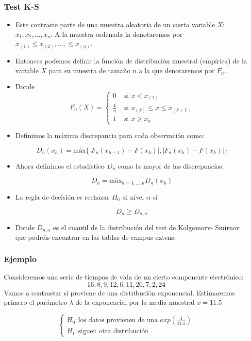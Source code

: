 \begin{frame}
\frametitle{Test K-S}
\begin{itemize}
\item Este contraste parte de una muestra aleatoria de un cierta variable $X$: $x_1,x_2,\ldots,x_n$. A la muestra ordenada la denotaremos por $x_{(1)}\leq x_{(2)},\ldots,\leq x_{(n)}$.           
\item Entonces podemos definir la función de distribución  muestral (empírica) de la variable $X$ para su muestra de tamaño $n$ a la que denotaremos por $F_{n}$.
\item Donde
          $$F_n(X)=\left\{\begin{array}{ll}
 0 &\mbox{ si } x< x_{(1)}  \\
  \frac{k}{n}&\mbox{ si }   x_{(k)}\leq  x \leq x_{(k+1)}\\
1 & \mbox{ si } x    \geq x_{n}  
\end{array}\right.$$
\end{itemize}
\end{frame}

\begin{frame}
\begin{itemize}
\item Definimos la máxima discrepancia para cada observación como:

$$D_n(x_h)=\mbox{máx}\{\left| F_{n}(x_{h-1})-F(x_h)\right|, \left| F_{n}(x_{h})-F(x_h)\right|\}$$
           
\item Ahora definimos el estadístico $D_n$ como la mayor de las discrepancias:
          
$$D_n=\mbox{máx}_{h=1,\ldots, n}D_n(x_h)$$ 

\item La regla de decisión es rechazar $H_0$ al nivel $\alpha$ si 

$$D_n\geq D_{n,\alpha}$$

\item  Donde $D_{n,\alpha}$ es el cuantil de la distribución del test de Kolgomorv- Smirnov que podréis encontrar en las tablas de campus extens.
\end{itemize}
\end{frame}

\begin{frame}
\frametitle{Ejemplo}
Consideremos una serie de tiempos de vida  de un cierto componente electrónico:       
           $$16,8,9,12,6,11,20,7,2,24$$
Vamos a contrastar si proviene de una distribución exponencial. Estimaremos primero el parámetro $\lambda$ de la exponencial por la media muestral $\overline{x}=11.5$

$$\left\{\begin{array}{ll}H_0: \mbox{los datos provienen de una } exp(\frac{1}{11.5})\\
H_1: \mbox{siguen otra distribución}\end{array}\right.
$$
\end{frame}

